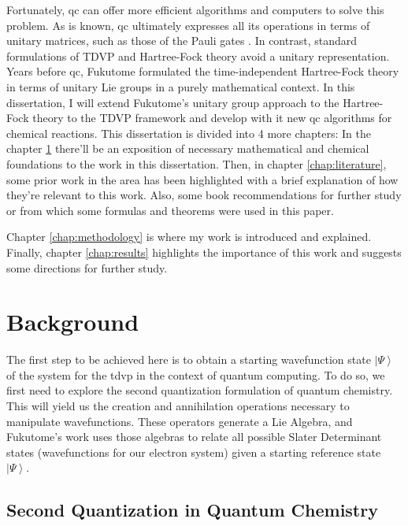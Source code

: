 \documentclass{aux/ttuthes2007}
\newcommand{\ket}[1]{\ensuremath{\left|#1\right\rangle}}
\begin{document}
Fortunately, \gls{qc}  can offer more efficient algorithms and computers to solve this problem.
As is known, \gls{qc} ultimately expresses all its operations in terms of unitary matrices, such as those of the Pauli gates .
In contrast, standard formulations of TDVP and Hartree-Fock theory  avoid a unitary representation.
Years before \gls{qc}, Fukutome  formulated the time-independent Hartree-Fock theory in terms of unitary Lie groups  in a purely mathematical context.
In this dissertation, I will extend Fukutome’s unitary group approach to the Hartree-Fock theory to the TDVP framework and develop with it new \gls{qc} algorithms for chemical reactions.
This dissertation is divided into 4 more chapters: In the chapter \ref{chap:background} there'll be an exposition of necessary mathematical and chemical foundations to the work in this dissertation.
Then, in chapter \ref{chap:literature}, some prior work in the area has been highlighted with a brief explanation of how they're relevant to this work.
Also, some book recommendations for further study or from which some formulas and theorems were used in this paper.

Chapter \ref{chap:methodology} is where my work is introduced and explained. Finally, chapter \ref{chap:results} highlights the importance of this work and suggests some directions for further study.

\chapter{\textbf{Background}}\label{chap:background}

The first step to be achieved here is to obtain a starting wavefunction state $\ket\Psi$ of the system for the \gls{tdvp} in the context of quantum computing. 
To do so, we first need to explore the second quantization formulation of quantum chemistry. 
This will yield us the creation and annihilation operations necessary to manipulate wavefunctions.
These operators generate a Lie Algebra, and Fukutome's work  uses those algebras to relate all possible Slater Determinant states (wavefunctions for our electron system) given a starting reference state $\ket\Psi$.

\section {\textbf{Second Quantization in Quantum Chemistry}}
\end{document}
